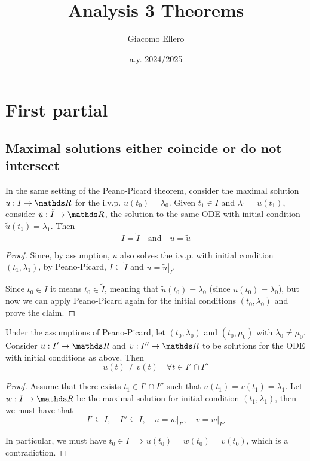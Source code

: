 \documentclass[12pt]{extarticle}
\title{Analysis 3 Theorems}
\author{Giacomo Ellero}
\date{a.y. 2024/2025}
\numberwithin{equation}{section}
\begin{document}
\section{First partial}

\subsection{Maximal solutions either coincide or do not intersect}

\begin{theorem}{}{}
    In the same setting of the Peano-Picard theorem,
    consider the maximal solution $u: I \to \R$
    for the i.v.p. $u(t_0) = \lambda_0$.
    Given $t_1 \in I$ and $\lambda_1 = u(t_1)$,
    consider $\tilde{u}: \tilde I \to \R$,
    the solution to the same ODE with initial condition $\tilde{u}(t_1) = \lambda_1$.
    Then
    \begin{equation}
        I = \tilde I \quad \text{and} \quad u = \tilde u
    \end{equation}
\end{theorem}

\begin{proof}
    Since, by assumption, $u$ also solves the i.v.p. with initial condition $(t_1, \lambda_1)$,
    by Peano-Picard, $I \subseteq \tilde I$ and $u = \left. \tilde u \right|_I$.

    Since $t_0 \in I$ it means $t_0 \in \tilde I$, meaning that $\tilde u(t_0) = \lambda_0$
    (since $u(t_0) = \lambda_0$), but now we can apply Peano-Picard again for the initial conditions $(t_0, \lambda_0)$
    and prove the claim.
\end{proof}


\begin{theorem}{}{}
    Under the assumptions of Peano-Picard, let $(t_0, \lambda_0)$ and $(t_0, \mu_0)$ with $\lambda_0 \ne \mu_0$.
    Consider $u: I' \to \R$ and $v: I'' \to \R$ to be solutions for the ODE with initial conditions as above.
    Then
    \begin{equation}
        u(t) \neq v(t) \quad \forall t \in I' \cap I''
    \end{equation}
\end{theorem}

\begin{proof}
    Assume that there exists $t_1 \in I' \cap I''$ such that $u(t_1) = v(t_1) = \lambda_1$.
    Let $w: I \to \R$ be the maximal solution for initial condition $(t_1, \lambda_1)$,
    then we must have that
    \begin{equation}
        I'\subseteq I, \quad I'' \subseteq I, \quad u = \left. w\right|_{I'}, \quad v = \left. w\right|_{I''}
    \end{equation}

    In particular, we must have $t_0 \in I \implies u(t_0) = w(t_0) = v(t_0)$, which is a contradiction.
\end{proof}
\end{document}
